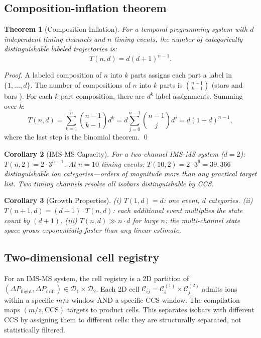 \documentclass[twocolumn,10pt,a4paper]{article}
\theoremstyle{thmstyle}
\newtheorem{theorem}{Theorem}[section]
\newtheorem{corollary}[theorem]{Corollary}
\theoremstyle{definition}
\theoremstyle{remark}
\newcommand{\DP}{\Delta P}
\newcommand{\calC}{\mathcal{C}}
\newcommand{\calD}{\mathcal{D}}
\begin{document}
\subsection{Composition-inflation theorem}

\begin{theorem}[Composition-Inflation]
\label{thm:inflation}
For a temporal programming system with $d$ independent timing channels
and $n$ timing events, the number of categorically distinguishable
labeled trajectories is:
\begin{equation}
T(n, d) = d(d+1)^{n-1}.
\label{eq:inflation}
\end{equation}
\end{theorem}

\begin{proof}
A labeled composition of $n$ into $k$ parts assigns each part a label
in $\{1,\ldots,d\}$. The number of compositions of $n$ into $k$ parts
is $\binom{n-1}{k-1}$ (stars and bars \citep{andrews1976}).
For each $k$-part composition, there are $d^k$ label assignments.
Summing over $k$:
\[
T(n,d) = \sum_{k=1}^{n}\binom{n-1}{k-1}d^k
= d\sum_{j=0}^{n-1}\binom{n-1}{j}d^j = d(1+d)^{n-1},
\]
where the last step is the binomial theorem. \qed
\end{proof}

\begin{corollary}[IMS-MS Capacity]
For a two-channel IMS-MS system ($d = 2$):
$T(n, 2) = 2 \cdot 3^{n-1}$.
At $n = 10$ timing events: $T(10, 2) = 2 \cdot 3^9 = 39{,}366$
distinguishable ion categories---orders of magnitude more than any
practical target list. Two timing channels resolve all isobars
distinguishable by CCS.
\end{corollary}

\begin{corollary}[Growth Properties]
(i) $T(1,d) = d$: one event, $d$ categories.
(ii) $T(n+1, d) = (d+1) \cdot T(n,d)$: each additional event multiplies
the state count by $(d+1)$.
(iii) $T(n,d) \gg n \cdot d$ for large $n$: the multi-channel state space
grows exponentially faster than any linear estimate.
\end{corollary}

\subsection{Two-dimensional cell registry}

For an IMS-MS system, the cell registry is a 2D partition of
$(\DP_{\mathrm{flight}}, \DP_{\mathrm{drift}}) \in \calD_1 \times \calD_2$.
Each 2D cell $\calC_{ij} = \calC_i^{(1)} \times \calC_j^{(2)}$ admits
ions within a specific $m/z$ window AND a specific CCS window.
The compilation maps $(m/z, \mathrm{CCS})$ targets to product cells.
This separates isobars with different CCS by assigning them to different
cells: they are structurally separated, not statistically filtered.
\end{document}
